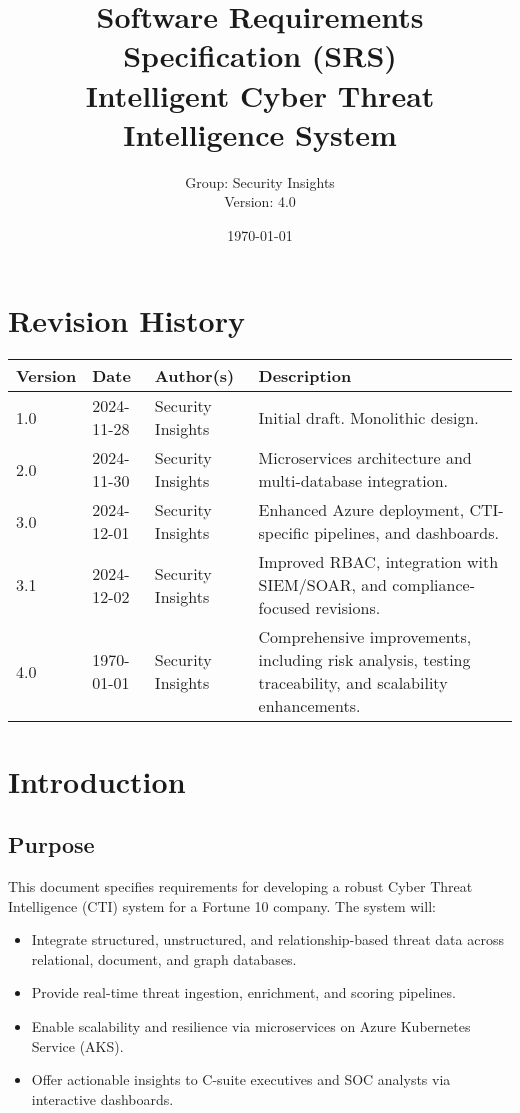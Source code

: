\documentclass[12pt]{article}
\title{Software Requirements Specification (SRS) \\ \vspace{1em} \Large Intelligent Cyber Threat Intelligence System}
\author{Group: Security Insights \\ Version: 4.0}
\date{\today}
\begin{document}
\maketitle
\thispagestyle{empty}

\newpage
\tableofcontents
\newpage

\section*{Revision History}
\begin{longtable}{|p{2cm}|p{3cm}|p{3cm}|p{5cm}|}
\hline
\textbf{Version} & \textbf{Date} & \textbf{Author(s)} & \textbf{Description} \\
\hline
1.0 & 2024-11-28 & Security Insights & Initial draft. Monolithic design. \\
\hline
2.0 & 2024-11-30 & Security Insights & Microservices architecture and multi-database integration. \\
\hline
3.0 & 2024-12-01 & Security Insights & Enhanced Azure deployment, CTI-specific pipelines, and dashboards. \\
\hline
3.1 & 2024-12-02 & Security Insights & Improved RBAC, integration with SIEM/SOAR, and compliance-focused revisions. \\
\hline
4.0 & \today & Security Insights & Comprehensive improvements, including risk analysis, testing traceability, and scalability enhancements. \\
\hline
\end{longtable}

\newpage

\section{Introduction}
\subsection{Purpose}
This document specifies requirements for developing a robust Cyber Threat Intelligence (CTI) system for a Fortune 10 company. The system will:
\begin{itemize}
    \item Integrate structured, unstructured, and relationship-based threat data across relational, document, and graph databases.
    \item Provide real-time threat ingestion, enrichment, and scoring pipelines.
    \item Enable scalability and resilience via microservices on Azure Kubernetes Service (AKS).
    \item Offer actionable insights to C-suite executives and SOC analysts via interactive dashboards.
\end{itemize}
\end{document}
